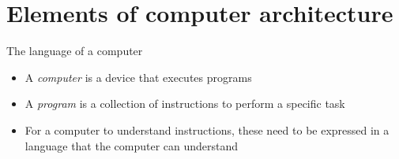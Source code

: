 

\section*{\color{white}Elements of computer architecture}

\begin{frame}{The language of a computer}
  \begin{itemize}[<+->]
  \item A \textit{computer} is a device that executes programs
  \item A \textit{program} is a collection of instructions to perform a specific
    task
  \item For a computer to understand instructions, these need to be expressed in a
    language that the computer can understand
  \end{itemize}

\end{frame}

